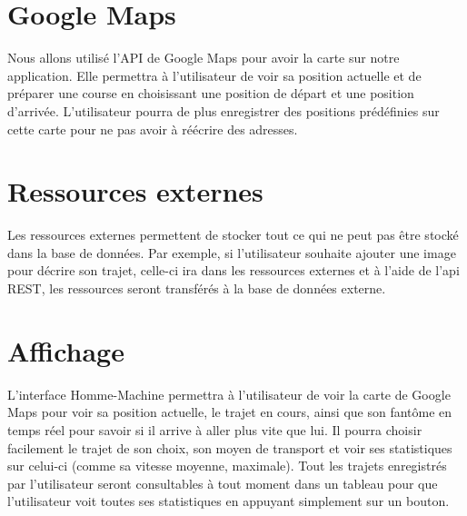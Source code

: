 \section{Google Maps}
Nous allons utilisé l'API de Google Maps pour avoir la carte sur notre application.
Elle permettra à l'utilisateur de voir sa position actuelle et de préparer une course en choisissant une position de départ et une position d'arrivée.
L'utilisateur pourra de plus enregistrer des positions prédéfinies sur cette carte pour ne pas avoir à réécrire des adresses.

\section{Ressources externes}
Les ressources externes permettent de stocker tout ce qui ne peut pas être stocké dans la base de données.
Par exemple, si l'utilisateur souhaite ajouter une image pour décrire son trajet, celle-ci ira dans les ressources externes et à l'aide de l'api REST,
les ressources seront transférés à la base de données externe.

\section{Affichage}
L'interface Homme-Machine permettra à l'utilisateur de voir la carte de Google Maps pour voir sa position actuelle, le trajet en cours,
ainsi que son fantôme en temps réel pour savoir si il arrive à aller plus vite que lui.
Il pourra choisir facilement le trajet de son choix, son moyen de transport et voir ses statistiques sur celui-ci (comme sa vitesse moyenne, maximale).
Tout les trajets enregistrés par l'utilisateur seront consultables à tout moment dans un tableau pour que l'utilisateur voit toutes ses statistiques en appuyant simplement sur un bouton.